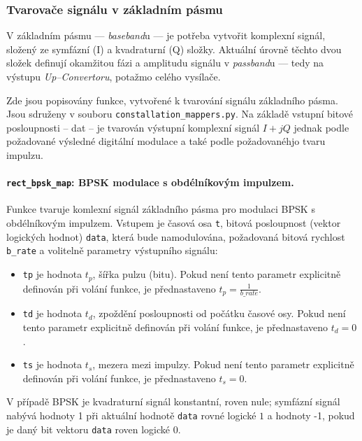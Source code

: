 \subsubsection{Tvarovače signálu v základním pásmu}
V základním pásmu --- \textsl{baseband}u --- je potřeba vytvořit komplexní signál, složený ze symfázní (I) a kvadraturní (Q) složky. Aktuální úrovně těchto dvou složek definují okamžitou fázi a amplitudu signálu v \textsl{passband}u --- tedy na výstupu \textsl{Up--Convertoru}, potažmo celého vysílače. 

Zde jsou popisovány funkce, vytvořené k tvarování signálu základního pásma. Jsou sdruženy v souboru \texttt{constallation\_mappers.py}. Na základě vstupní bitové posloupnosti -- dat -- je tvarován výstupní komplexní signál $I + jQ$ jednak podle požadované výsledné digitální modulace a také podle požadovanéhjo tvaru impulzu.
 
\paragraph{\texttt{rect\_bpsk\_map}: BPSK modulace s obdélníkovým impulzem.}
Funkce tvaruje komlexní signál základního pásma pro modulaci BPSK s obdélníkovým impulzem. 
Vstupem je časová osa \texttt{t}, bitová posloupnost (vektor logických hodnot) \texttt{data}, která bude namodulována, požadovaná bitová rychlost \texttt{b\_rate} a volitelně parametry výstupního signálu:
\begin{itemize}
\item \texttt{tp} je hodnota $t_p$, šířka pulzu (bitu). Pokud není tento parametr explicitně definován při volání funkce, je přednastaveno $t_p = \frac{1}{b\_rate}$.
\item \texttt{td} je hodnota $t_d$, zpoždění posloupnosti od počátku časové osy. Pokud není tento parametr explicitně definován při volání funkce, je přednastaveno $t_d = 0$.
\item \texttt{ts} je hodnota $t_s$, mezera mezi impulzy. Pokud není tento parametr explicitně definován při volání funkce, je přednastaveno $t_s = 0$.
\end{itemize}

V případě BPSK je kvadraturní signál konstantní, roven nule; symfázní signál nabývá hodnoty 1 při aktuální hodnotě \texttt{data} rovné logické $1$ a hodnoty -1, pokud je daný bit vektoru \texttt{data} roven logické $0$.   

